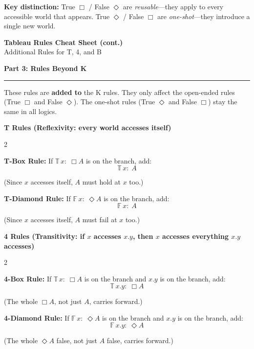\documentclass[10pt]{article}
\newcommand{\T}{\mathbb{T}}
\newcommand{\F}{\mathbb{F}}
\newcommand{\ruleheader}[1]{\medskip\noindent\textbf{\large #1}\par\smallskip\hrule\smallskip}
\newcommand{\rulesubheader}[1]{\smallskip\noindent\textbf{#1}\par\smallskip}
\begin{document}
\smallskip
\textbf{Key distinction:} True $\Box$ / False $\Diamond$ are \emph{reusable}---they apply to every accessible world that appears. True $\Diamond$ / False $\Box$ are \emph{one-shot}---they introduce a single new world.

\newpage

\begin{center}
{\LARGE\bfseries Tableau Rules Cheat Sheet (cont.)}\\[4pt]
{\large Additional Rules for T, 4, and B}
\end{center}

\ruleheader{Part 3: Rules Beyond K}

These rules are \textbf{added to} the K rules. They only affect the open-ended rules (True $\Box$ and False $\Diamond$). The one-shot rules (True $\Diamond$ and False $\Box$) stay the same in all logics.

\bigskip

\rulesubheader{T Rules (Reflexivity: every world accesses itself)}

\begin{multicols}{2}

\textbf{T-Box Rule:} If $\T\, x{:}\; \Box A$ is on the branch, add:
$$\T\, x{:}\; A$$

(Since $x$ accesses itself, $A$ must hold at $x$ too.)

\columnbreak

\textbf{T-Diamond Rule:} If $\F\, x{:}\; \Diamond A$ is on the branch, add:
$$\F\, x{:}\; A$$

(Since $x$ accesses itself, $A$ must fail at $x$ too.)

\end{multicols}

\bigskip

\rulesubheader{4 Rules (Transitivity: if $x$ accesses $x.y$, then $x$ accesses everything $x.y$ accesses)}

\begin{multicols}{2}

\textbf{4-Box Rule:} If $\T\, x{:}\; \Box A$ is on the branch and $x.y$ is on the branch, add:
$$\T\, x.y{:}\; \Box A$$

(The whole $\Box A$, not just $A$, carries forward.)

\columnbreak

\textbf{4-Diamond Rule:} If $\F\, x{:}\; \Diamond A$ is on the branch and $x.y$ is on the branch, add:
$$\F\, x.y{:}\; \Diamond A$$

(The whole $\Diamond A$ false, not just $A$ false, carries forward.)

\end{multicols}
\end{document}
